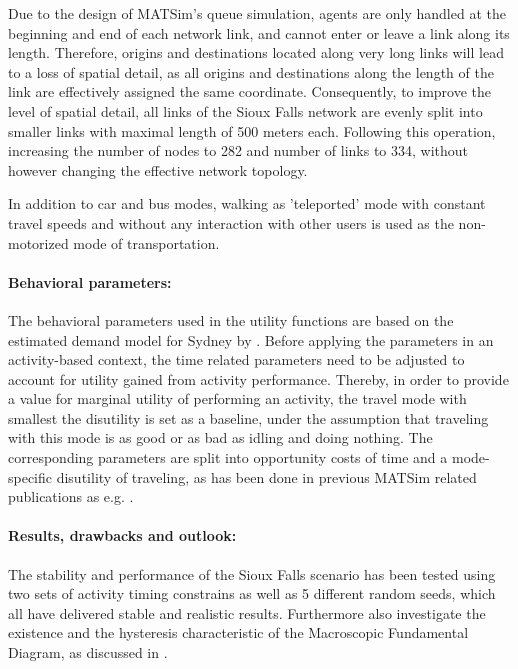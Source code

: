 Due to the design of MATSim’s queue simulation, agents are only handled at the beginning and end of each network link, and cannot enter or leave a link along its length. Therefore, origins and destinations located along very long links will lead to a loss of spatial detail, as all origins and destinations along the length of the link are effectively assigned the same coordinate. Consequently, to improve the level of spatial detail, all links of the Sioux Falls network are evenly split into smaller links with maximal length of 500 meters each. Following this operation, increasing the number of nodes to 282 and number of links to 334, without however changing the effective network topology.

In addition to car and bus modes, walking as 'teleported' mode with constant travel speeds and without any interaction with other users is used as the non-motorized mode of transportation. 

\paragraph{Behavioral parameters:}

The behavioral parameters used in the utility functions are based on the estimated demand model for Sydney by \citet[][]{TirachiniHensherRose_TransResB_2014}. Before applying the parameters in an activity-based context, the time related parameters need to be adjusted to account for utility gained from activity performance. Thereby, in order to provide a value for marginal utility of performing an activity, the travel mode with smallest the disutility is set as a baseline, under the assumption that traveling with this mode is as good or as bad as idling and doing nothing. The corresponding parameters are split into opportunity costs of time and a mode-specific disutility of traveling, as has been done in previous MATSim related publications as e.g. \citet[][]{KickhoeferEtAl_Transportation_2011}. 

\paragraph{Results, drawbacks and outlook:}

The stability and performance of the Sioux Falls scenario has been tested using two sets of activity timing constrains as well as 5 different random seeds, which all have delivered stable and realistic results. Furthermore \citet[][]{ChakirovFourie_TechRep_FCL_2014} also investigate the existence and the hysteresis characteristic of the Macroscopic Fundamental Diagram, as discussed in \citet[][]{GeroliminisDaganzo_TRB_2007, GeroliminisDaganzo_TransResB_2008, GeroliminisSun_TransResA_2011}. 

